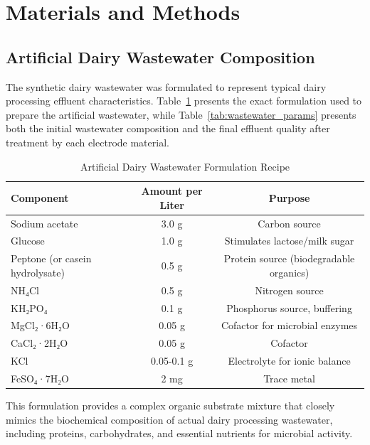 \documentclass[12pt,a4paper]{article}
\begin{document}
\section{Materials and Methods}

\subsection{Artificial Dairy Wastewater Composition}

The synthetic dairy wastewater was formulated to represent typical dairy processing effluent characteristics. Table~\ref{tab:wastewater_recipe} presents the exact formulation used to prepare the artificial wastewater, while Table~\ref{tab:wastewater_params} presents both the initial wastewater composition and the final effluent quality after treatment by each electrode material.

\begin{table}[H]
\centering
\caption{Artificial Dairy Wastewater Formulation Recipe}
\label{tab:wastewater_recipe}
\begin{tabular}{@{}lcc@{}}
\toprule
\textbf{Component} & \textbf{Amount per Liter} & \textbf{Purpose} \\
\midrule
Sodium acetate & 3.0 g & Carbon source \\
Glucose & 1.0 g & Stimulates lactose/milk sugar \\
Peptone (or casein hydrolysate) & 0.5 g & Protein source (biodegradable organics) \\
NH₄Cl & 0.5 g & Nitrogen source \\
KH₂PO₄ & 0.1 g & Phosphorus source, buffering \\
MgCl₂·6H₂O & 0.05 g & Cofactor for microbial enzymes \\
CaCl₂·2H₂O & 0.05 g & Cofactor \\
KCl & 0.05-0.1 g & Electrolyte for ionic balance \\
FeSO₄·7H₂O & 2 mg & Trace metal \\
\bottomrule
\end{tabular}
\end{table}

This formulation provides a complex organic substrate mixture that closely mimics the biochemical composition of actual dairy processing wastewater, including proteins, carbohydrates, and essential nutrients for microbial activity.
\end{document}

